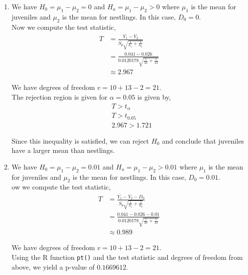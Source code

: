 \documentclass[12pt]{article}
\newenvironment{problem}[2][Problem]{\begin{trivlist}
\item[\hskip \labelsep {\bfseries #1}\hskip \labelsep {\bfseries #2.}]}{\end{trivlist}}
\begin{document}
\begin{problem}{10.70}
\end{problem}

\begin{enumerate}[label=\alph*)]
	\item We have $H_0 = \mu_1 - \mu_2 = 0$ and $H_a = \mu_1 - \mu_2 > 0$ where $\mu_1$ is the mean for juveniles and $\mu_2$ is the mean for nestlings. In this case, $D_0 = 0$.\\
	
	Now we compute the test statistic,
	\begin{align*}
		T &= \frac{\overline{Y_1} - \overline{Y_2}}{S_p\sqrt{\frac{1}{n_1}+\frac{1}{n_2}}}\\
		&= \frac{0.041 - 0.026}{0.0120178\sqrt{\frac{1}{10}+\frac{1}{13}}}\\
		&\approx 2.967
	\end{align*}
	
	We have degrees of freedom $v = 10 + 13 - 2 = 21$.\\
	
	The rejection region is given for $\alpha = 0.05$ is given by,
	\begin{align*}
		&T > t_{\alpha}\\
		&T > t_{0.05}\\
		&2.967 > 1.721
	\end{align*}
	
	Since this inequality is satisfied, we can reject $H_0$ and conclude that juveniles have a larger mean than nestlings.
	
	\item We have $H_0 = \mu_1 - \mu_2 = 0.01$ and $H_a = \mu_1 - \mu_2 > 0.01$ where $\mu_1$ is the mean for juveniles and $\mu_2$ is the mean for nestlings. In this case, $D_0 = 0.01$.\\
	
	ow we compute the test statistic,
	\begin{align*}
		T &= \frac{\overline{Y_1} - \overline{Y_2} - D_0}{S_p\sqrt{\frac{1}{n_1}+\frac{1}{n_2}}}\\
		&= \frac{0.041 - 0.026 - 0.01}{0.0120178\sqrt{\frac{1}{10}+\frac{1}{13}}}\\
		&\approx 0.989
	\end{align*}
	
	We have degrees of freedom $v = 10 + 13 - 2 = 21$.\\
	
	Using the R function \texttt{pt()} and the test statistic and degrees of freedom from above, we yield a p-value of $0.1669612$.
\end{enumerate}
\end{document}
